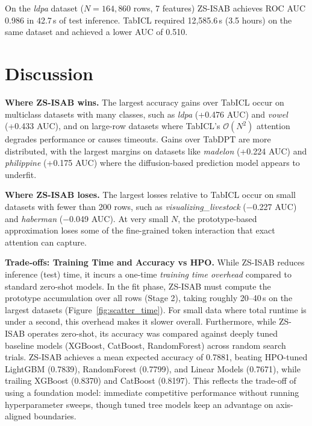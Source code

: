 \documentclass{article}
\begin{document}
On the \textit{ldpa} dataset ($N = 164{,}860$ rows, 7 features) ZS-ISAB achieves ROC AUC 0.986 in 42.7\,s of test inference. TabICL required 12{,}585.6\,s (3.5 hours) on the same dataset and achieved a lower AUC of 0.510.

\section{Discussion}

\textbf{Where ZS-ISAB wins.}
The largest accuracy gains over TabICL occur on multiclass datasets with many classes, such as \textit{ldpa} (+0.476 AUC) and \textit{vowel} (+0.433 AUC), and on large-row datasets where TabICL's $\mathcal{O}(N^2)$ attention degrades performance or causes timeouts. Gains over TabDPT are more distributed, with the largest margins on datasets like \textit{madelon} (+0.224 AUC) and \textit{philippine} (+0.175 AUC) where the diffusion-based prediction model appears to underfit.

\textbf{Where ZS-ISAB loses.}
The largest losses relative to TabICL occur on small datasets with fewer than 200 rows, such as \textit{visualizing\_livestock} ($-$0.227 AUC) and \textit{haberman} ($-$0.049 AUC). At very small $N$, the prototype-based approximation loses some of the fine-grained token interaction that exact attention can capture.

\textbf{Trade-offs: Training Time and Accuracy vs HPO.}
While ZS-ISAB reduces inference (test) time, it incurs a one-time \emph{training time overhead} compared to standard zero-shot models. In the fit phase, ZS-ISAB must compute the prototype accumulation over all rows (Stage 2), taking roughly 20--40\,s on the largest datasets (Figure~\ref{fig:scatter_time}). For small data where total runtime is under a second, this overhead makes it slower overall. 
Furthermore, while ZS-ISAB operates zero-shot, its accuracy was compared against deeply tuned baseline models (XGBoost, CatBoost, RandomForest) across random search trials. ZS-ISAB achieves a mean expected accuracy of 0.7881, beating HPO-tuned LightGBM (0.7839), RandomForest (0.7799), and Linear Models (0.7671), while trailing XGBoost (0.8370) and CatBoost (0.8197). This reflects the trade-off of using a foundation model: immediate competitive performance without running hyperparameter sweeps, though tuned tree models keep an advantage on axis-aligned boundaries.
\end{document}
